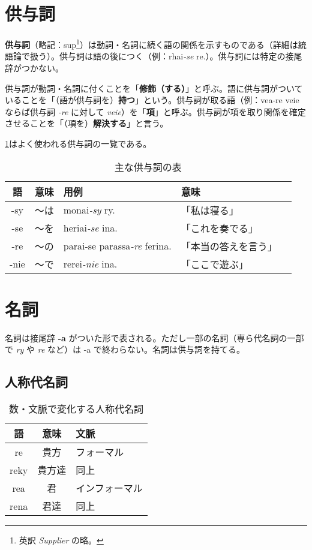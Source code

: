 \section{供与詞}

\textbf{供与詞}（略記：sup\footnote{英訳 \emph{Supplier} の略。}）は動詞・名詞に続く語の関係を示すものである（詳細は統語論で扱う）。供与詞は語の後につく（例：rhai\emph{-se} re.）。供与詞には特定の接尾辞がつかない。

供与詞が動詞・名詞に付くことを「\textbf{修飾（する）}」と呼ぶ。語に供与詞がついていることを「（語が供与詞を）\textbf{持つ}」という。供与詞が取る語（例：vea-re veie ならば供与詞 \emph{-re} に対して \emph{veie}）を「\textbf{項}」と呼ぶ。供与詞が項を取り関係を確定させることを「（項を）\textbf{解決する}」と言う。

\cref{table:common-sups}はよく使われる供与詞の一覧である。

\begin{table}[H]
    \centering
    \caption{主な供与詞の表}
    \label{table:common-sups}
    \begin{tabular}{cclll}
        \toprule
        語 & 意味 & 用例 & 意味 \\
        \midrule
        -sy  & ～は & monai\emph{-sy} ry.                & 「私は寝る」\\
        -se  & ～を & heriai\emph{-se} ina.              & 「これを奏でる」\\
        -re  & ～の & parai-se parassa\emph{-re} ferina. & 「本当の答えを言う」\\
        -nie & ～で & rerei\emph{-nie} ina.              & 「ここで遊ぶ」 \\
        \bottomrule
    \end{tabular}
\end{table}

\section{名詞}

名詞は接尾辞 \textbf{-a} がついた形で表される。ただし一部の名詞（専ら代名詞の一部で \emph{ry} や \emph{re} など）は -a で終わらない。名詞は供与詞を持てる。

\subsection{人称代名詞}

\begin{wraptable}[6]{r}{50mm}
    \centering
    \caption{数・文脈で変化する人称代名詞}
    \label{table:list-of-re-rea}
    \begin{tabular}{ccl}
        \toprule
        語 & 意味 & 文脈 \\
        \midrule
        re    & 貴方  & フォーマル \\
        reky  & 貴方達 & 同上 \\
        rea   & 君    & インフォーマル \\
        rena  & 君達  & 同上 \\
        \bottomrule
    \end{tabular}
\end{wraptable}

